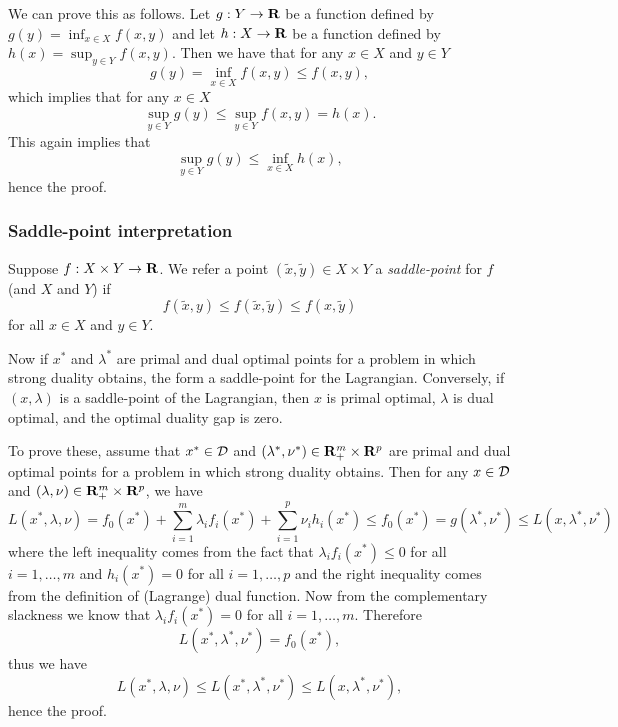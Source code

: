 We can prove this as follows.
Let $g:Y\to\mathbf{R}$ be a function defined by $g(y) = \inf_{x \in X} f(x,y)$ and
let $h:X\to\mathbf{R}$ be a function defined by $h(x) = \sup_{y \in Y} f(x,y)$.
Then we have that for any $x\in X$ and $y\in Y$
\begin{equation}
g(y) = \inf_{x\in X} f(x,y) \leq f(x,y),
\end{equation}
which implies that for any $x\in X$
\begin{equation}
\sup_{y\in Y} g(y) \leq \sup_{y\in Y} f(x,y) = h(x).
\end{equation}
This again implies that
\begin{equation}
\sup_{y\in Y} g(y) \leq \inf_{x\in X} h(x),
\end{equation}
hence the proof.




\subsubsection{Saddle-point interpretation}

Suppose $f:X\times Y \to \mathbf{R}$.
We refer a point $(\tilde{x}, \tilde{y}) \in X\times Y$ a \emph{saddle-point}
for $f$ (and $X$ and $Y$) if
\begin{equation}
f(\tilde{x},y) \leq f(\tilde{x},\tilde{y}) \leq f(x, \tilde{y})
\end{equation}
for all $x \in X$ and $y\in Y$.

Now if $x^\ast$ and $\lambda^\ast$
are primal and dual optimal points for a problem in which strong duality obtains,
the form a saddle-point for the Lagrangian.
Conversely, if $(x,\lambda)$ is a saddle-point of the Lagrangian, then $x$ is primal optimal, $\lambda$ is dual optimal,
and the optimal duality gap is zero.

To prove these, assume that $x^\ast\in\mathcal{D}$ and $(\lambda^\ast, \nu^\ast) \in \mathbf{R}^m_+ \times \mathbf{R}^p$
are primal and dual optimal points for a problem in which strong duality obtains.
Then for any $x\in\mathcal{D}$ and $(\lambda, \nu) \in \mathbf{R}^m_+ \times \mathbf{R}^p$,
we have
\begin{equation}
L(x^\ast, \lambda, \nu) =
f_0(x^\ast) + \sum_{i=1}^m \lambda_i f_i(x^\ast) + \sum_{i=1}^p \nu_i h_i(x^\ast)
\leq
f_0(x^\ast) = g(\lambda^\ast, \nu^\ast) \leq L(x,\lambda^\ast, \nu^\ast)
\end{equation}
where the left inequality comes from the fact that $\lambda_i f_i(x^\ast) \leq 0$ for all $i=1,\ldots, m$
and $h_i(x^\ast)=0$ for all $i=1,\ldots, p$
and the right inequality comes from the definition of (Lagrange) dual function.
Now from the complementary slackness we know that $\lambda_i f_i(x^\ast) = 0$ for all $i=1,\ldots, m$.
Therefore
\begin{equation}
L(x^\ast,\lambda^\ast, \nu^\ast) = f_0(x^\ast),
\end{equation}
thus we have
\begin{equation}
L(x^\ast, \lambda, \nu)
\leq L(x^\ast, \lambda^\ast, \nu^\ast)
\leq L(x, \lambda^\ast, \nu^\ast),
\end{equation}
hence the proof.

